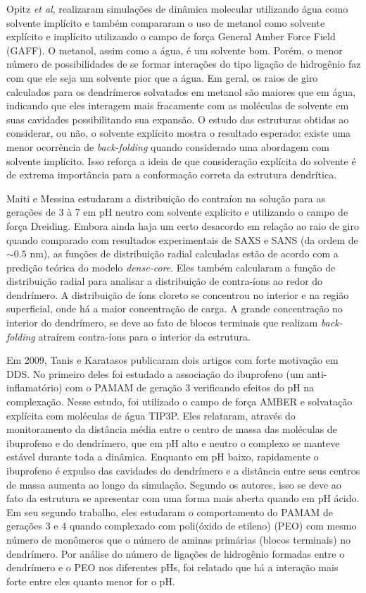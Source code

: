 Opitz \textit{et al}\cite{Opitz2006}, realizaram simulações de dinâmica molecular utilizando água como solvente implícito e também compararam o uso de metanol como solvente explícito e implícito utilizando o campo de força General Amber Force Field (GAFF)\cite{Wang2004}.
O metanol, assim como a água, é um solvente bom.
Porém, o menor número de possibilidades de se formar interações do tipo ligação de hidrogênio faz com que ele seja um solvente pior que a água.
Em geral, os raios de giro calculados para os dendrímeros solvatados em metanol são maiores que em água, indicando que eles interagem mais fracamente com as moléculas de solvente em suas cavidades possibilitando sua expansão.
O estudo das estruturas obtidas ao considerar, ou não, o solvente explícito mostra o resultado esperado: existe uma menor ocorrência de \textit{back-folding} quando considerado uma abordagem com solvente implícito.
Isso reforça a ideia de que consideração explícita do solvente é de extrema importância para a conformação correta da estrutura dendrítica.

Maiti e Messina\cite{Maiti2008} estudaram a distribuição do contraíon na solução para as gerações de $3$ à $7$ em pH neutro com solvente explícito e utilizando o campo de força Dreiding\cite{Mayo1990}.
Embora ainda haja um certo desacordo em relação ao raio de giro quando comparado com resultados experimentais de SAXS e SANS (da ordem de $\sim 0.5$ nm), as funções de distribuição radial calculadas estão de acordo com a predição teórica do modelo \textit{dense-core}.
Eles também calcularam a função de distribuição radial para analisar a distribuição de contra-íons ao redor do dendrímero.
A distribuição de íons cloreto se concentrou no interior e na região superficial, onde há a maior concentração de carga.
A grande concentração no interior do dendrímero, se deve ao fato de blocos terminais que realizam \textit{back-folding} atraírem contra-íons para o interior da estrutura.

Em 2009, Tanis e Karatasos publicaram dois artigos com forte motivação em DDS.
No primeiro deles\cite{Tanis2009a} foi estudado a associação do ibuprofeno (um anti-inflamatório) com o PAMAM de geração 3 verificando efeitos do pH na complexação.
Nesse estudo, foi utilizado o campo de força AMBER\cite{Weiner1984} e solvatação explícita com moléculas de água TIP3P.
Eles relataram, através do monitoramento da distância média entre o centro de massa das moléculas de ibuprofeno e do dendrímero, que em pH alto e neutro o complexo se manteve estável durante toda a dinâmica.
Enquanto em pH baixo, rapidamente o ibuprofeno é expulso das cavidades do dendrímero e a distância entre seus centros de massa aumenta ao longo da simulação.
Segundo os autores, isso se deve ao fato da estrutura se apresentar com uma forma mais aberta quando em pH ácido.
Em seu segundo trabalho\cite{Tanis2009}, eles estudaram o comportamento do PAMAM de gerações 3 e 4 quando complexado com poli(óxido de etileno) (PEO) com mesmo número de monômeros que o número de aminas primárias (blocos terminais) no dendrímero.
Por análise do número de ligações de hidrogênio formadas entre o dendrímero e o PEO nos diferentes pHs, foi relatado que há a interação mais forte entre eles quanto menor for o pH.

